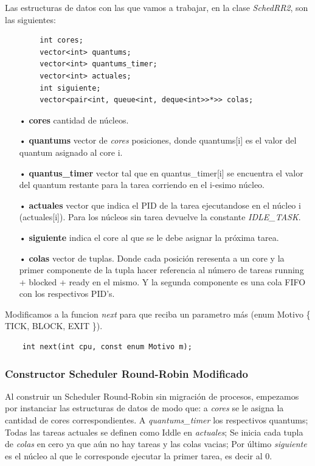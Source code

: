 \documentclass[a4paper]{article}
\begin{document}
Las estructuras de datos con las que vamos a trabajar, en la clase \emph{SchedRR2}, son las siguientes:


	\begin{codesnippet}
	\begin{verbatim}
		int cores;
		vector<int> quantums;
		vector<int> quantums_timer;
		vector<int> actuales;
		int siguiente;
		vector<pair<int, queue<int, deque<int>>*>> colas;
	\end{verbatim}
	\end{codesnippet}
	
	\begin{itemize}
	\item[•]\textbf{cores} cantidad de n\'ucleos.
	\item[•]\textbf{quantums} vector de \emph{cores} posiciones, donde quantums[i] es el valor del quantum asignado al core i.
	\item[•]\textbf{quantus_timer}  vector tal que en quantus_timer[i] se encuentra el valor del quantum restante para la tarea corriendo en el i-esimo núcleo.
	\item[•]\textbf{actuales} vector que indica el PID de la tarea ejecutandose en el núcleo i (actuales[i]). Para los núcleos sin tarea devuelve la constante \textit{IDLE\_TASK}.
	\item[•]\textbf{siguiente} indica el core al que se le debe asignar la próxima tarea.
	\item[•]\textbf{colas} vector de tuplas. Donde cada posición reresenta a un core y la primer componente de la tupla hacer referencia al número de tareas running + blocked + ready en el mismo. Y la segunda componente es una cola FIFO con los respectivos PID's.  
	\end{itemize}	
	
\noindent  Modificamos a la funcion \emph{next} para que reciba un parametro m\'as (enum Motivo \{ TICK, BLOCK, EXIT \}).
	\begin{codesnippet}
	\begin{verbatim}
    int next(int cpu, const enum Motivo m);
	\end{verbatim}
	\end{codesnippet}
		
\subsubsection*{Constructor Scheduler Round-Robin Modificado}		

Al construir un Scheduler Round-Robin sin migración de procesos, empezamos por instanciar las estructuras de datos de modo que: a \emph{cores} se le asigna la cantidad de cores correspondientes. A \emph{quantums\_timer} los respectivos quantums; Todas las tareas actuales se definen como Iddle en \emph{actuales}; Se inicia cada tupla de \emph{colas} en cero ya que aún no hay tareas y las colas vacias; Por último \emph{siguiente} es el n\'ucleo al que le corresponde ejecutar la primer tarea, es decir al 0.
\end{document}
